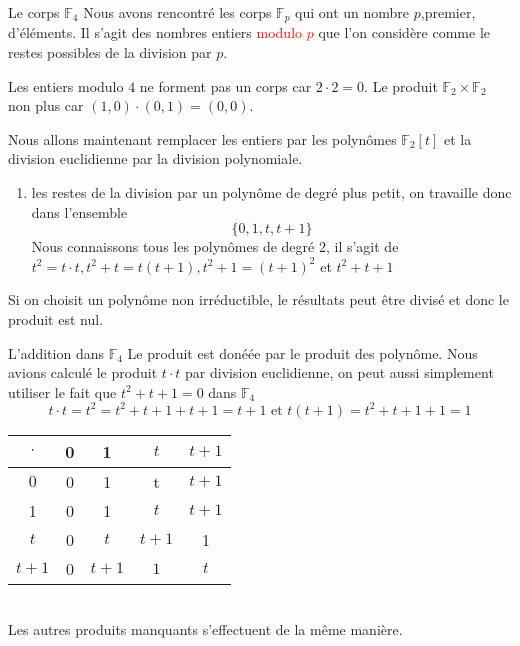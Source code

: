 \begin{parag}{Le corps $\mathbb{F}_4$}
    Nous avons rencontré les corps $ \mathbb{F}_p$ qui ont un nombre $p$,premier, d'éléments. Il s'agit des nombres entiers \textcolor{red}{modulo $p$} que l'on considère comme le restes possibles de la division par $p$.
    \begin{framedremark}
        Les entiers modulo $4$ ne forment pas un corps car $2 \cdot 2 = 0$. Le produit $\mathbb{F}_2 \times \mathbb{F}_2$ non plus car $(1, 0) \cdot (0, 1) = (0, 0)$.
    \end{framedremark}
    Nous allons maintenant remplacer les entiers par les polynômes $\mathbb{F}_2[t]$ et la division euclidienne par la division polynomiale.
    \begin{enumerate}
        \item les restes de la division par un polynôme de degré plus petit, on travaille donc dans l'ensemble
        \[\{0, 1, t, t+1\}\]
        Nous connaissons tous les polynômes de degré $2$, il s'agit de $t^2 = t\cdot t, t^2 + t = t(t+1), t^2+1 = (t+1)^2$ et $t^2 + t + 1$
    \end{enumerate}
    \begin{framedremark}
        Si on choisit un polynôme non irréductible, le résultats peut être divisé et donc le produit est nul.
    \end{framedremark}
    \begin{subparag}{L'addition dans $\mathbb{F}_4$}
    Le produit est donéée par le produit des polynôme. Nous avions calculé le produit $t\cdot t$ par division euclidienne, on peut aussi simplement utiliser le fait que $t^2 + t + 1 = 0$ dans $\mathbb{F}_4$
    \[t\cdot t = t^2 = t^2 + t + 1 + t + 1 = t + 1 \text{ et } t(t+1) = t^2 + t + 1 + 1 = 1\]
        
       
           \begin{tabular}{|c||c|c|c|c|}
           \hline
               $\cdot$ &0  & 1 & $t$ & $t+1$\\
               \hline
               \hline
               $0$ & 0 & 1 & t & $t+1$\\
               \hline
                1&0& 1 & $t$ & $t+1$ \\
                \hline
                $t$& 0 & $t$ & $t+1$ &1 \\
                \hline
                $t+1$& 0 & $t+1$ & $1$ & $t$\\
                \hline
           \end{tabular}
        \\
        Les autres produits manquants s'effectuent de la même manière.
        
    \end{subparag}
\end{parag}